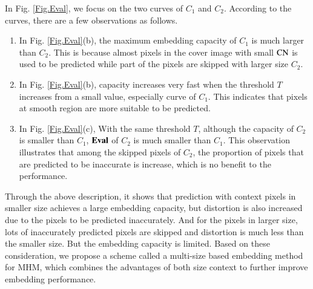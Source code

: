 \documentclass[review,3p,10pt,sort&compress]{elsarticle}
\begin{document}
In Fig. \ref{Fig.Eval}, we focus on the two curves of $C_1$ and $C_2$. According to the curves, there are a few observations as follows. 
\begin{enumerate}
  \item In Fig. \ref{Fig.Eval}(b), the maximum embedding capacity of $C_1$ is much larger than $C_2$. This is because almost pixels in the cover image with small ${\rm CN}$ is used to be predicted while part of the pixels are skipped with larger size $C_2$.
  \item In Fig. \ref{Fig.Eval}(b), capacity increases very fast when the threshold $T$ increases from a small value, especially curve of $C_1$. This indicates that pixels at smooth region are more suitable to be predicted.
  \item In Fig. \ref{Fig.Eval}(c), With the same threshold $T$, although the capacity of $C_2$ is smaller than $C_1$, ${\rm \mathbf{Eval}}$ of $C_2$ is much smaller than $C_1$. This observation illustrates that among the skipped pixels of $C_2$, the proportion of pixels that are predicted to be inaccurate is increase, which is no benefit to the performance.
\end{enumerate}
Through the above description, it shows that prediction with context pixels in smaller size achieves a large embedding capacity, but distortion is also increased due to the pixels to be predicted inaccurately. And for the pixels in larger size, lots of inaccurately predicted pixels are skipped and distortion is much less than the smaller size. But the embedding capacity is limited. Based on these consideration, we propose a scheme called a multi-size based embedding method for MHM, which combines the advantages of both size context to further improve embedding performance.


\end{document}
